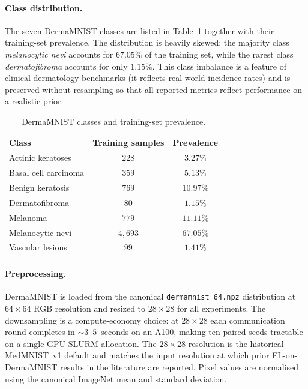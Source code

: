 \documentclass[11pt,a4paper]{report}
\begin{document}
\paragraph{Class distribution.}
The seven DermaMNIST classes are listed in
Table~\ref{tab:dataset-classes} together with their training-set
prevalence. The distribution is heavily skewed: the majority class
\emph{melanocytic nevi} accounts for $67.05\%$ of the training
set, while the rarest class \emph{dermatofibroma} accounts for
only $1.15\%$. This class imbalance is a feature of clinical
dermatology benchmarks (it reflects real-world incidence rates)
and is preserved without resampling so that all reported metrics
reflect performance on a realistic prior.

\begin{table}[!htbp]
\centering
\caption{DermaMNIST classes and training-set prevalence.}
\label{tab:dataset-classes}
\small
\begin{tabular}{lcc}
\toprule
Class & Training samples & Prevalence \\
\midrule
Actinic keratoses          & $228$   & $3.27\%$  \\
Basal cell carcinoma       & $359$   & $5.13\%$  \\
Benign keratosis           & $769$   & $10.97\%$ \\
Dermatofibroma             & $80$    & $1.15\%$  \\
Melanoma                   & $779$   & $11.11\%$ \\
Melanocytic nevi           & $4{,}693$ & $67.05\%$ \\
Vascular lesions           & $99$    & $1.41\%$  \\
\bottomrule
\end{tabular}
\end{table}

\paragraph{Preprocessing.}
DermaMNIST is loaded from the canonical \texttt{dermamnist\_64.npz}
distribution at $64\times64$ RGB resolution and resized to
$28\times28$ for all experiments. The downsampling is a
compute-economy choice: at $28\times28$ each communication round
completes in $\sim 3$--$5$~seconds on an A100, making ten paired
seeds tractable on a single-GPU SLURM allocation. The $28\times28$
resolution is the historical MedMNIST~v1 default and matches the
input resolution at which prior FL-on-DermaMNIST results in the
literature are reported. Pixel values are normalised using the
canonical ImageNet mean and standard deviation.
\end{document}
